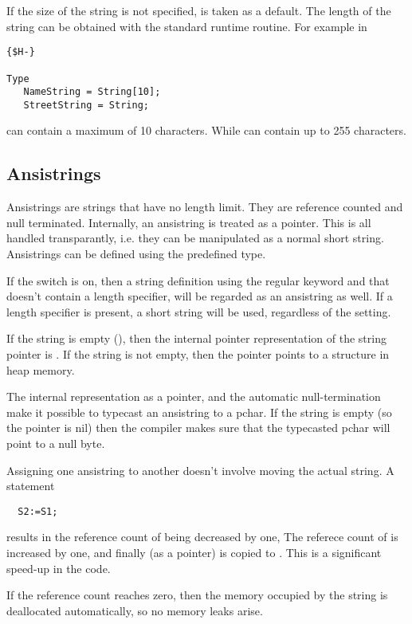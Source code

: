 If the size of the string is not specified,  is taken as a
default. The length of the string can be obtained with the 
standard runtime routine.
For example in
\begin{verbatim}
{$H-}

Type
   NameString = String[10];
   StreetString = String;
\end{verbatim}
 can contain a maximum of 10 characters. While
 can contain up to 255 characters.

\subsection{Ansistrings}
Ansistrings are strings that have no length limit. They are reference
counted and null terminated. Internally, an ansistring is treated as 
a pointer. This is all handled transparantly, i.e. they can be manipulated 
as a normal short string. Ansistrings can be defined using the predefined
 type.

If the  switch is on, then a string definition using the
regular  keyword and that doesn't contain a length specifier, 
will be regarded as an ansistring as well. If a length specifier is present,
a short string will be used, regardless of the  setting.

If the string is empty (), then the internal pointer representation
of the string pointer is . If the string is not empty, then the 
pointer points to a structure in heap memory.

The internal representation as a pointer, and the automatic null-termination
make it possible to typecast an ansistring to a pchar. If the string is empty 
(so the pointer is nil) then the compiler makes sure that the typecasted 
pchar will point to a null byte.

Assigning one ansistring to another doesn't involve moving the actual
string. A statement
\begin{verbatim}
  S2:=S1;
\end{verbatim}
results in the reference count of  being decreased by one,
The referece count of  is increased by one, and finally 
(as a pointer) is copied to . This is a significant speed-up in
the code.

If the reference count reaches zero, then the memory occupied by the
string is deallocated automatically, so no memory leaks arise.

